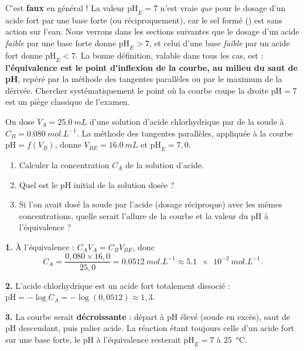 \documentclass[11pt]{article}
\begin{document}
\begin{attention}[Erreur fréquente : « l'équivalence, c'est toujours pH = 7 »]
C'est \textbf{faux} en général ! La valeur $\mathrm{pH}_E = 7$ n'est vraie \emph{que} pour le dosage d'un acide fort par une base forte (ou réciproquement), car le sel formé () est sans action sur l'eau. Nous verrons dans les sections suivantes que le dosage d'un acide \emph{faible} par une base forte donne $\mathrm{pH}_E > 7$, et celui d'une base \emph{faible} par un acide fort donne $\mathrm{pH}_E < 7$. La bonne définition, valable dans tous les cas, est : \textbf{l'équivalence est le point d'inflexion de la courbe, au milieu du saut de pH}, repéré par la méthode des tangentes parallèles ou par le maximum de la dérivée. Chercher systématiquement le point où la courbe coupe la droite $\mathrm{pH} = 7$ est un piège classique de l'examen.
\end{attention}

\begin{exercice}
On dose $V_A = \SI{25,0}{mL}$ d'une solution d'acide chlorhydrique par de la soude à $C_B = \SI{0,080}{mol.L^{-1}}$. La méthode des tangentes parallèles, appliquée à la courbe $\mathrm{pH} = f(V_B)$, donne $V_{BE} = \SI{16,0}{mL}$ et $\mathrm{pH}_E = 7{,}0$.
\begin{enumerate}
\item Calculer la concentration $C_A$ de la solution d'acide.
\item Quel est le pH initial de la solution dosée ?
\item Si l'on avait dosé la soude par l'acide (dosage réciproque) avec les mêmes concentrations, quelle serait l'allure de la courbe et la valeur du pH à l'équivalence ?
\end{enumerate}
\end{exercice}

\begin{corrige}[Exercice n°1]
\textbf{1.} À l'équivalence : $C_A V_A = C_B V_{BE}$, donc
\[ C_A = \frac{0{,}080 \times 16{,}0}{25{,}0} = \SI{0,0512}{mol.L^{-1}} \approx \SI{5,1e-2}{mol.L^{-1}}. \]

\textbf{2.} L'acide chlorhydrique est un acide fort totalement dissocié : $\mathrm{pH} = -\log C_A = -\log(0{,}0512) \approx 1{,}3$.

\textbf{3.} La courbe serait \textbf{décroissante} : départ à pH élevé (soude en excès), saut de pH descendant, puis palier acide. La réaction étant toujours celle d'un acide fort sur une base forte, le pH à l'équivalence resterait $\mathrm{pH}_E = 7$ à \SI{25}{\celsius}.
\end{corrige}
\end{document}
